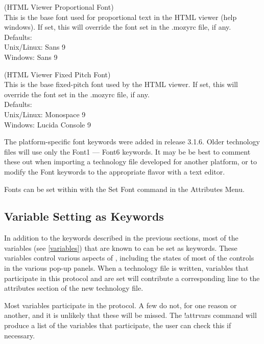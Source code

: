 \begin{description}
\item{} (HTML Viewer Proportional Font)\\
This is the base font used for proportional text in the HTML viewer
(help windows).  If set, this will override the font set in the {\vt
.mozyrc} file, if any.\\
Defaults:\\
Unix/Linux: {\vt Sans 9}\\
Windows: {\vt Sans 9}

\item{} (HTML Viewer Fixed Pitch Font)\\
This is the base fixed-pitch font used by the HTML viewer.  If set,
this will override the font set in the {\vt .mozyrc} file, if any.\\
Defaults:\\
Unix/Linux: {\vt Monospace 9}\\
Windows: {\vt Lucida Console 9}
\end{description}

The platform-specific font keywords were added in release 3.1.6. 
Older technology files will use only the {\vt Font1 --- Font6}
keywords.  It may be be best to comment these out when importing a
technology file developed for another platform, or to modify the {\vt
Font} keywords to the appropriate flavor with a text editor.

Fonts can be set within {\Xic} with the {\cb Set Font} command in the
{\cb Attributes Menu}.


\subsection{Variable Setting as Keywords}
\label{attrvars}
In addition to the keywords described in the previous sections, most
of the variables (see \ref{variables}) that are known to {\Xic} can be
set as keywords.  These variables control various aspects of {\Xic},
including the states of most of the controls in the various pop-up
panels.  When a technology file is written, variables that participate
in this protocol and are set will contribute a corresponding line to
the attributes section of the new technology file.

Most variables participate in the protocol.  A few do not, for one
reason or another, and it is unlikely that these will be missed.  The
{\cb !attrvars} command will produce a list of the variables that
participate, the user can check this if necessary.

